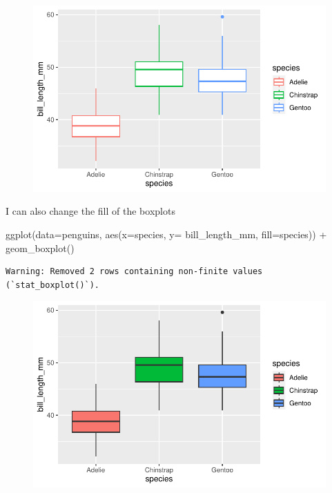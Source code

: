 \documentclass[
  letterpaper,
  DIV=11,
  numbers=noendperiod]{scrartcl}
\newenvironment{Shaded}{\begin{snugshade}}{\end{snugshade}}
\newcommand{\AttributeTok}[1]{\textcolor[rgb]{0.40,0.45,0.13}{#1}}
\newcommand{\FunctionTok}[1]{\textcolor[rgb]{0.28,0.35,0.67}{#1}}
\newcommand{\NormalTok}[1]{\textcolor[rgb]{0.00,0.23,0.31}{#1}}
\newcommand{\SpecialCharTok}[1]{\textcolor[rgb]{0.37,0.37,0.37}{#1}}
\begin{document}
\begin{figure}[H]

{\centering \includegraphics{colors_files/figure-pdf/unnamed-chunk-2-1.pdf}

}

\end{figure}

I can also change the fill of the boxplots

\begin{Shaded}
\begin{Highlighting}[]
\FunctionTok{ggplot}\NormalTok{(}\AttributeTok{data=}\NormalTok{penguins, }\FunctionTok{aes}\NormalTok{(}\AttributeTok{x=}\NormalTok{species, }\AttributeTok{y=}\NormalTok{ bill\_length\_mm, }\AttributeTok{fill=}\NormalTok{species)) }\SpecialCharTok{+}
  \FunctionTok{geom\_boxplot}\NormalTok{()}
\end{Highlighting}
\end{Shaded}

\begin{verbatim}
Warning: Removed 2 rows containing non-finite values (`stat_boxplot()`).
\end{verbatim}

\begin{figure}[H]

{\centering \includegraphics{colors_files/figure-pdf/unnamed-chunk-3-1.pdf}

}

\end{figure}
\end{document}
